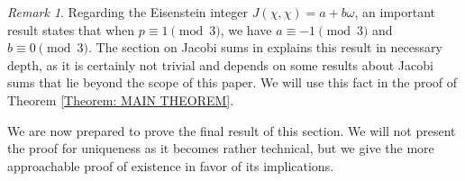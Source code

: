\documentclass[10pt]{amsart}
\theoremstyle{plain}
\theoremstyle{definition}
\theoremstyle{remark}
\newtheorem{rem}{Remark}
\numberwithin{equation}{section}
\begin{document}
\begin{rem} \label{Remark: Implication of J(x,x)=a+bw}
    Regarding the Eisenstein integer $J(\chi,\chi)=a+b\omega$, an important result states that when $p\equiv 1\pmod{3}$, we have $a\equiv -1\pmod{3}$ and $b\equiv 0\pmod{3}$. The section on Jacobi sums in \cite{ireland1990classical} explains this result in necessary depth, as it is certainly not trivial and depends on some results about Jacobi sums that lie beyond the scope of this paper. We will use this fact in the proof of Theorem \ref{Theorem: MAIN THEOREM}.
\end{rem}

We are now prepared to prove the final result of this section. We will not present the proof for uniqueness as it becomes rather technical, but we give the more approachable proof of existence in favor of its implications. 
\end{document}
